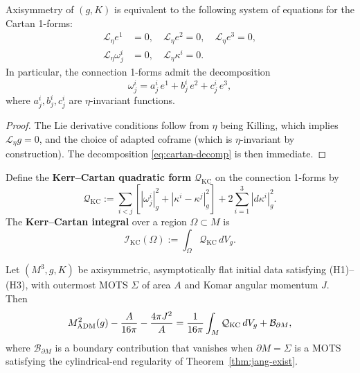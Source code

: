 \begin{lemma}\label{lem:cartan-axisymmetry}
Axisymmetry of $(g, K)$ is equivalent to the following system of equations for the Cartan 1-forms:
\begin{align}
\mathcal{L}_\eta e^1 &= 0, \quad \mathcal{L}_\eta e^2 = 0, \quad \mathcal{L}_\eta e^3 = 0, \\
\mathcal{L}_\eta \omega^i_j &= 0, \quad \mathcal{L}_\eta \kappa^i = 0.
\end{align}
In particular, the connection 1-forms admit the decomposition
\begin{equation}\label{eq:cartan-decomp}
\omega^i_j = a^i_j \, e^1 + b^i_j \, e^2 + c^i_j \, e^3,
\end{equation}
where $a^i_j, b^i_j, c^i_j$ are $\eta$-invariant functions.
\end{lemma}

\begin{proof}
The Lie derivative conditions follow from $\eta$ being Killing, which implies $\mathcal{L}_\eta g = 0$, and the choice of adapted coframe (which is $\eta$-invariant by construction). The decomposition \eqref{eq:cartan-decomp} is then immediate.
\end{proof}

\begin{definition}\label{def:kc-qf}
Define the \textbf{Kerr--Cartan quadratic form} $\mathcal{Q}_{\mathrm{KC}}$ on the connection 1-forms by
\begin{equation}\label{eq:kc-qf}
\mathcal{Q}_{\mathrm{KC}} := \sum_{i < j} \left[ |\omega^i_j|^2_g + |\kappa^i - \kappa^j|^2_g \right] + 2 \sum_{i=1}^{3} |d\kappa^i|^2_g.
\end{equation}
The \textbf{Kerr--Cartan integral} over a region $\Omega \subset M$ is
\begin{equation}
\mathcal{I}_{\mathrm{KC}}(\Omega) := \int_{\Omega} \mathcal{Q}_{\mathrm{KC}} \, dV_g.
\end{equation}
\end{definition}

\begin{theorem}\label{thm:kcii-main}
Let $(M^3, g, K)$ be axisymmetric, asymptotically flat initial data satisfying (H1)--(H3), with outermost MOTS $\Sigma$ of area $A$ and Komar angular momentum $J$. Then
\begin{equation}\label{eq:kcii-main}
M_{\mathrm{ADM}}^2(g) - \frac{A}{16\pi} - \frac{4\pi J^2}{A} = \frac{1}{16\pi} \int_M \mathcal{Q}_{\mathrm{KC}} \, dV_g + \mathcal{B}_{\partial M},
\end{equation}
where $\mathcal{B}_{\partial M}$ is a boundary contribution that vanishes when $\partial M = \Sigma$ is a MOTS satisfying the cylindrical-end regularity of Theorem~\ref{thm:jang-exist}.
\end{theorem}

